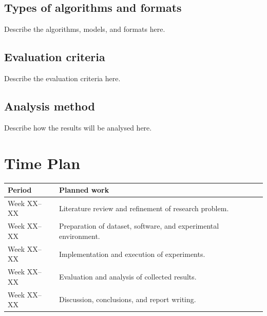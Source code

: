 \documentclass[10pt,a4paper]{article}
\begin{document}
\subsection{Types of algorithms and formats}


Describe the algorithms, models, and formats here.

\subsection{Evaluation criteria}

Describe the evaluation criteria here.

\subsection{Analysis method}


Describe how the results will be analysed here.



\section{Time Plan}

\begin{center}
\begin{tabular}{p{} p{}}
\textbf{Period} & \textbf{Planned work} \\ \hline
Week XX--XX & Literature review and refinement of research problem. \\
Week XX--XX & Preparation of dataset, software, and experimental environment. \\
Week XX--XX & Implementation and execution of experiments. \\
Week XX--XX & Evaluation and analysis of collected results. \\
Week XX--XX & Discussion, conclusions, and report writing. \\
\end{tabular}
\end{center}
\end{document}

